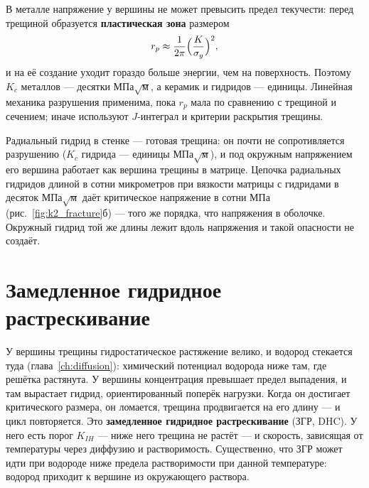 
В металле напряжение у вершины не может превысить предел текучести: перед трещиной образуется \textbf{пластическая зона}
размером
\begin{equation}
r_p\approx\frac{1}{2\pi}\Bigl(\frac{K}{\sigma_y}\Bigr)^2,
\end{equation}
и на её создание уходит гораздо больше энергии, чем на поверхность. Поэтому $K_c$ металлов --- десятки
МПа$\sqrt{\text{м}}$, а керамик и гидридов --- единицы. Линейная механика разрушения применима, пока $r_p$ мала по
сравнению с трещиной и сечением; иначе используют $J$-интеграл и критерии раскрытия трещины.

\begin{zrbox}
Радиальный гидрид в стенке --- готовая трещина: он почти не сопротивляется разрушению ($K_c$ гидрида --- единицы
МПа$\sqrt{\text{м}}$), и под окружным напряжением его вершина работает как вершина трещины в матрице. Цепочка
радиальных гидридов длиной в сотни микрометров при вязкости матрицы с гидридами в десяток МПа$\sqrt{\text{м}}$
даёт критическое напряжение в сотни МПа (рис.~\ref{fig:k2_fracture}б) --- того же порядка, что напряжения в оболочке.
Окружный гидрид той же длины лежит вдоль напряжения и такой опасности не создаёт.
\end{zrbox}

\section{Замедленное гидридное растрескивание}

У вершины трещины гидростатическое растяжение велико, и водород стекается туда (глава~\ref{ch:diffusion}):
химический потенциал водорода ниже там, где решётка растянута. У вершины концентрация превышает предел выпадения, и
там вырастает гидрид, ориентированный поперёк нагрузки. Когда он достигает критического размера, он ломается,
трещина продвигается на его длину --- и цикл повторяется. Это \textbf{замедленное гидридное растрескивание} (ЗГР, DHC).
У него есть порог $K_{IH}$ --- ниже него трещина не растёт --- и скорость, зависящая от температуры через диффузию и
растворимость. Существенно, что ЗГР может идти при водороде ниже предела растворимости при данной температуре:
водород приходит к вершине из окружающего раствора.

